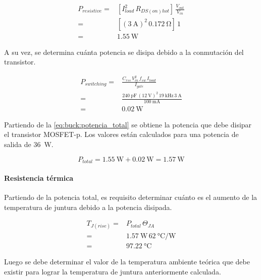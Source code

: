 \begin{align} \label{eq:buck:potencia_resistiva}
    P_{resistive} =& \left[ I_{load}^2 \, R_{DS(on)hot} \right] \, \frac{V_{out}}{V_{in}} \\
    =& \left[ (\SI{3}{\ampere})^2 \, \SI{0.172}{\ohm}\right] \, 1 \nonumber \\
    =& \SI{1,55}{\watt} \nonumber
\end{align}

A su vez, se determina cuánta potencia se disipa debido a la conmutación del transistor.

\begin{align} \label{eq:buck:potencia_conmutación}
    P_{switching} =& \frac{C_{rss} \, V_{in}^2 \, f_{sw} \, I_{load}}{I_{gate}} \\
    =& \frac{\SI{240}{\pico\farad} \, (\SI{12}{\volt})^2 \, \SI{19}{\kilo\hertz} \, \SI{3}{\ampere}}{\SI{100}{\milli\ampere}} \nonumber \\
    =& \SI{0.02}{\watt} \nonumber
\end{align}

Partiendo de la \cref{eq:buck:potencia_total} se obtiene la potencia que debe disipar el transistor MOSFET-p. Los valores están calculados para una potencia de salida de \SI{36}{W}.

\begin{equation*}
    P_{total} = \SI{1.55}{\watt} + \SI{0.02}{\watt} = \SI{1.57}{\watt}
\end{equation*}

\paragraph{Resistencia térmica}

Partiendo de la potencia total, es requisito determinar cuánto es el aumento de la temperatura de juntura debido a la potencia disipada.

\begin{align} \label{eq:buck:temperatura_juntura_rise}
    T_{J(rise)} =& P_{total} \, \Theta_{JA} \\
    =& \SI{1.57}{\watt} \, \SI[per-mode=symbol]{62}{\celsius\per\watt} \nonumber \\
    =& \SI{97.22}{\celsius} \nonumber
\end{align}

Luego se debe determinar el valor de la temperatura ambiente teórica que debe existir para lograr la temperatura de juntura anteriormente calculada.

